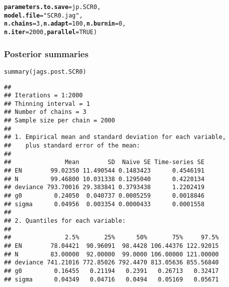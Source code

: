 \documentclass[color=usenames,dvipsnames]{beamer}\usepackage[]{graphicx}\usepackage[]{color}
\makeatletter
\newcommand{\hlnum}[1]{\textcolor[rgb]{0.69,0.494,0}{#1}}%
\newcommand{\hlstr}[1]{\textcolor[rgb]{0.749,0.012,0.012}{#1}}%
\newcommand{\hlstd}[1]{\textcolor[rgb]{0,0,0}{#1}}%
\newcommand{\hlkwc}[1]{\textcolor[rgb]{0,0,0}{\textbf{#1}}}%
\newcommand{\hlkwd}[1]{\textcolor[rgb]{0.004,0.004,0.506}{#1}}%
\newenvironment{kframe}{%
 \def\at@end@of@kframe{}%
 \ifinner\ifhmode%
  \def\at@end@of@kframe{\end{minipage}}%
  \begin{minipage}{\columnwidth}%
 \fi\fi%
 \def\FrameCommand##1{\hskip\@totalleftmargin \hskip-\fboxsep
 \colorbox{shadecolor}{##1}\hskip-\fboxsep
     \hskip-\linewidth \hskip-\@totalleftmargin \hskip\columnwidth}%
 \MakeFramed {\advance\hsize-\width
   \@totalleftmargin\z@ \linewidth\hsize
   \@setminipage}}%
 {\par\unskip\endMakeFramed%
 \at@end@of@kframe}
\newenvironment{knitrout}{}{} %
\makeatother
\begin{document}
\begin{frame}[fragile]
\begin{knitrout}
\begin{kframe}
\begin{alltt}
                             \hlkwc{parameters.to.save}\hlstd{=jp.SCR0,}
                             \hlkwc{model.file}\hlstd{=}\hlstr{"SCR0.jag"}\hlstd{,}
                             \hlkwc{n.chains}\hlstd{=}\hlnum{3}\hlstd{,} \hlkwc{n.adapt}\hlstd{=}\hlnum{100}\hlstd{,} \hlkwc{n.burnin}\hlstd{=}\hlnum{0}\hlstd{,}
                             \hlkwc{n.iter}\hlstd{=}\hlnum{2000}\hlstd{,} \hlkwc{parallel}\hlstd{=}\hlnum{TRUE}\hlstd{)}
\end{alltt}
\end{kframe}
\end{knitrout}
\end{frame}




\begin{frame}[fragile]
  \frametitle{Posterior summaries}
\begin{knitrout}\tiny
{}\color{fgcolor}\begin{kframe}
\begin{alltt}
\hlkwd{summary}\hlstd{(jags.post.SCR0)}
\end{alltt}
\begin{verbatim}
## 
## Iterations = 1:2000
## Thinning interval = 1 
## Number of chains = 3 
## Sample size per chain = 2000 
## 
## 1. Empirical mean and standard deviation for each variable,
##    plus standard error of the mean:
## 
##               Mean        SD  Naive SE Time-series SE
## EN        99.02350 11.490544 0.1483423      0.4546191
## N         99.46800 10.031338 0.1295040      0.4220134
## deviance 793.70016 29.383841 0.3793438      1.2202419
## g0         0.24050  0.040737 0.0005259      0.0018846
## sigma      0.04956  0.003354 0.0000433      0.0001558
## 
## 2. Quantiles for each variable:
## 
##               2.5%       25%      50%       75%     97.5%
## EN        78.04421  90.96091  98.4428 106.44376 122.92015
## N         83.00000  92.00000  99.0000 106.00000 121.00000
## deviance 741.21016 772.85026 792.4470 813.05636 855.56840
## g0         0.16455   0.21194   0.2391   0.26713   0.32417
## sigma      0.04349   0.04716   0.0494   0.05169   0.05671
\end{verbatim}
\end{kframe}
\end{knitrout}
\end{frame}
\end{document}
